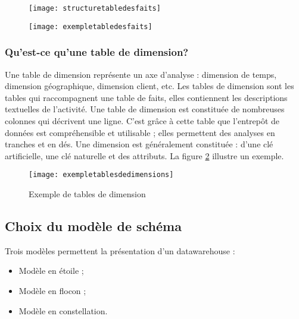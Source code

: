 \begin{figure}[H]
    \centering
    \begin{minipage}{.6\textwidth}
      \centering
      \texttt{[image: structuretabledesfaits]}
      \label{fig:structuretabledesfaits}
    \end{minipage}%
    \begin{minipage}{.4\textwidth}
      \centering
      \texttt{[image: exempletabledesfaits]}
      \label{fig:exempletabledesfaits}
    \end{minipage}
\end{figure}

\subsubsection{Qu’est-ce qu’une table de dimension?}
Une table de dimension représente un axe d’analyse : dimension de temps, dimension géographique, dimension client, etc. Les tables de dimension sont les tables qui raccompagnent une table de faits, elles contiennent les descriptions textuelles de l’activité. Une table de dimension est constituée de nombreuses colonnes qui décrivent une ligne. C’est grâce à cette table que l’entrepôt de données est compréhensible et utilisable ; elles permettent des analyses en tranches et en dés. Une dimension est généralement constituée : d’une clé artificielle, une clé naturelle et des attributs. La figure \ref{fig:exempletablesdedimensions} illustre un exemple.

\begin{figure}[H]
    \centering
    \texttt{[image: exempletablesdedimensions]}
    \caption{Exemple de tables de dimension}
    \label{fig:exempletablesdedimensions}
\end{figure}

\subsection{Choix du modèle de schéma}
Trois modèles permettent la présentation d’un datawarehouse :
\begin{itemize}
    \item Modèle en étoile ;
    \item Modèle en flocon ;
    \item Modèle en constellation.
\end{itemize}


